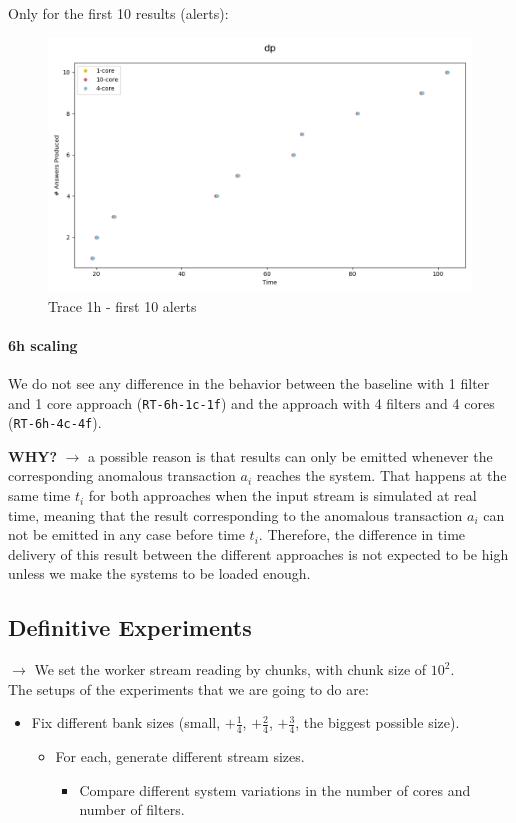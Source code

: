 Only for the first 10 results (alerts):
\begin{figure}[H]
  \centering
  \includegraphics[scale = 0.5]{images/4-Experiments/traces-1h-10.png}
  \caption{Trace 1h - first 10 alerts}
\end{figure}

\paragraph{6h scaling\\}

We do not see any difference in the behavior between the baseline with 1 filter and 1 core approach (\texttt{RT-6h-1c-1f}) and the approach with 4 filters and 4 cores (\texttt{RT-6h-4c-4f}). 

\textbf{WHY?} $\rightarrow$ a possible reason is that results can only be emitted whenever the corresponding anomalous transaction $a_i$ reaches the system. That happens at the same time $t_i$ for both approaches when the input stream is simulated at real time, meaning that the result corresponding to the anomalous transaction $a_i$ can not be emitted in any case before time $t_i$. Therefore, the difference in time delivery of this result between the different approaches is not expected to be high unless we make the systems to be loaded enough.

\subsection{Definitive Experiments}

$\rightarrow$ We set the worker stream reading by chunks, with chunk size of $10^2$.\\

The setups of the experiments that we are going to do are:
\begin{itemize}
  \item Fix different bank sizes (small, $+\frac{1}{4}$, $+\frac{2}{4}$, $+\frac{3}{4}$, the biggest possible size).
  \begin{itemize}
    \item For each, generate different stream sizes.
    \begin{itemize}
      \item Compare different system variations in the number of cores and number of filters.
    \end{itemize}
  \end{itemize}
\end{itemize}

